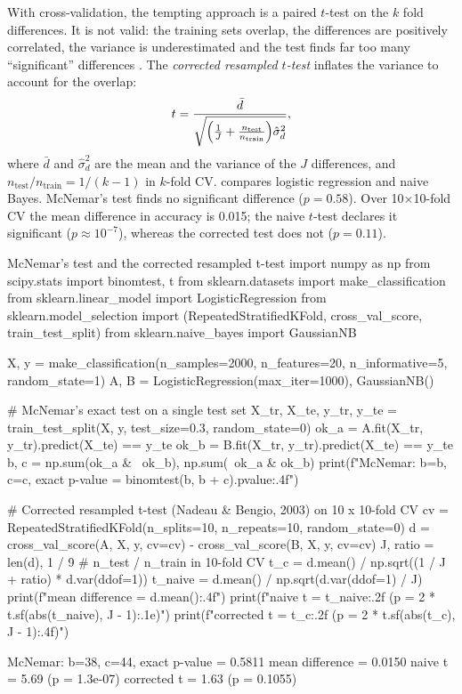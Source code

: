 With cross-validation, the tempting approach is a paired $t$-test on the $k$ fold differences.
It is not valid: the training sets overlap, the differences are positively correlated, the
variance is underestimated and the test finds far too many ``significant'' differences
\citep{dietterich1998approximate}. The \emph{corrected resampled $t$-test}
\citep{nadeau2003inference} inflates the variance to account for the overlap:
\begin{equation}
  t=\frac{\bar d}{\sqrt{\Bigl(\frac1J+\frac{n_{\text{test}}}{n_{\text{train}}}\Bigr)\hat\sigma_d^2}},
\end{equation}
where $\bar d$ and $\hat\sigma_d^2$ are the mean and the variance of the $J$ differences, and
$n_{\text{test}}/n_{\text{train}}=1/(k-1)$ in $k$-fold CV.  compares logistic
regression and naive Bayes. McNemar's test finds no significant difference ($p=0.58$). Over
10$\times$10-fold CV the mean difference in accuracy is 0.015; the naive $t$-test declares it
significant ($p\approx10^{-7}$), whereas the corrected test does not ($p=0.11$).

\begin{pylisting}[label={lst:compare}]{McNemar's test and the corrected resampled t-test}
import numpy as np
from scipy.stats import binomtest, t
from sklearn.datasets import make_classification
from sklearn.linear_model import LogisticRegression
from sklearn.model_selection import (RepeatedStratifiedKFold, cross_val_score,
                                     train_test_split)
from sklearn.naive_bayes import GaussianNB

X, y = make_classification(n_samples=2000, n_features=20, n_informative=5,
                           random_state=1)
A, B = LogisticRegression(max_iter=1000), GaussianNB()

# McNemar's exact test on a single test set
X_tr, X_te, y_tr, y_te = train_test_split(X, y, test_size=0.3, random_state=0)
ok_a = A.fit(X_tr, y_tr).predict(X_te) == y_te
ok_b = B.fit(X_tr, y_tr).predict(X_te) == y_te
b, c = np.sum(ok_a & ~ok_b), np.sum(~ok_a & ok_b)
print(f"McNemar: b={b}, c={c}, exact p-value = {binomtest(b, b + c).pvalue:.4f}")

# Corrected resampled t-test (Nadeau & Bengio, 2003) on 10 x 10-fold CV
cv = RepeatedStratifiedKFold(n_splits=10, n_repeats=10, random_state=0)
d = cross_val_score(A, X, y, cv=cv) - cross_val_score(B, X, y, cv=cv)
J, ratio = len(d), 1 / 9                  # n_test / n_train in 10-fold CV
t_c = d.mean() / np.sqrt((1 / J + ratio) * d.var(ddof=1))
t_naive = d.mean() / np.sqrt(d.var(ddof=1) / J)
print(f"mean difference = {d.mean():.4f}")
print(f"naive t = {t_naive:.2f} (p = {2 * t.sf(abs(t_naive), J - 1):.1e})")
print(f"corrected t = {t_c:.2f} (p = {2 * t.sf(abs(t_c), J - 1):.4f})")
\end{pylisting}
\begin{pyoutput}
McNemar: b=38, c=44, exact p-value = 0.5811
mean difference = 0.0150
naive t = 5.69 (p = 1.3e-07)
corrected t = 1.63 (p = 0.1055)
\end{pyoutput}

